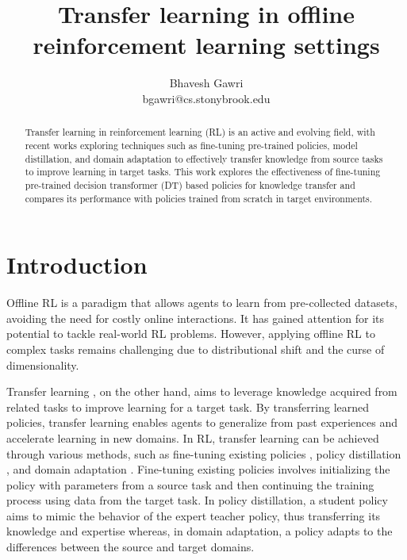 \documentclass[10pt,a4paper]{article}
\title{Transfer learning in offline reinforcement learning settings}
\author{Bhavesh Gawri \\ bgawri@cs.stonybrook.edu \\}
\begin{document}
\maketitle
{}%

\begin{abstract}
Transfer learning in reinforcement learning (RL) is an active and evolving field, 
with recent works exploring techniques such as fine-tuning pre-trained policies, 
model distillation, and domain adaptation to effectively transfer knowledge 
from source tasks to improve learning in target tasks. This work explores the 
effectiveness of fine-tuning pre-trained decision transformer (DT) based policies for 
knowledge transfer and compares its performance with policies trained from scratch 
in target environments.

\end{abstract}


\section{Introduction}
Offline RL \cite{levine2020offline} is a 
paradigm that allows agents to learn from pre-collected datasets, 
avoiding the need for costly online interactions. It has gained 
attention for its potential to tackle real-world RL problems. 
However, applying offline RL to complex tasks remains challenging 
due to distributional shift and the curse of dimensionality.

Transfer learning \cite{taylor2009transfer, pan2010survey, zhuang2020comprehensive}, 
on the other hand, aims to leverage knowledge acquired from related tasks 
to improve learning for a target task. By transferring learned policies, 
transfer learning enables agents to generalize from past experiences and 
accelerate learning in new domains. In RL, transfer learning can be achieved 
through various methods, such as fine-tuning existing policies \cite{lee2022multi, xu2023hyper}, 
policy distillation \cite{rusu2015policy, tseng2022offline}, and domain adaptation 
\cite{xing2021domain, eysenbach2020off}. Fine-tuning existing policies involves 
initializing the policy with parameters from a source task and then continuing 
the training process using data from the target task. In policy distillation, a 
student policy aims to mimic the behavior of the expert teacher policy, thus 
transferring its knowledge and expertise whereas, in domain adaptation, a policy 
adapts to the differences between the source and target domains.
\end{document}
